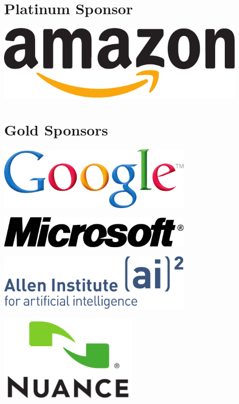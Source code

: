 \clearpage
\renewcommand{\leftheader}{Conference Sponsors}
\renewcommand{\rightheader}{Conference Sponsors}

\section*{Platinum Sponsor}
\begin{center}
\includegraphics[width=0.9\textwidth]{logos/amazon_logo_CMYK}
\end{center}
\vspace{0.5in}

\section*{Gold Sponsors}
\begin{center}
\includegraphics[width=0.7\textwidth]{logos/GoogleShadedLogo_Print-crop}
\end{center}
\begin{center}
\includegraphics[width=0.7\textwidth]{logos/mslogo-1_72dpi-Oct2013.jpg}
\end{center}
\begin{center}
\includegraphics[width=0.7\textwidth]{logos/A2_Logo-crop}
\end{center}
\begin{center}
\includegraphics[width=0.5\textwidth]{logos/Large_Nuance_Logo.pdf}
\end{center}


